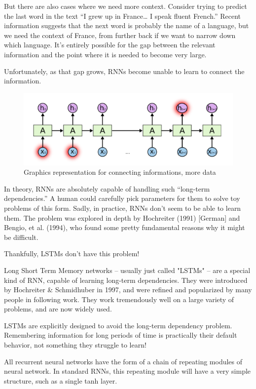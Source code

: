 But there are also cases where we need more context. Consider trying to predict the last word in the text “I grew up in France… I speak fluent French.” Recent information suggests that the next word is probably the name of a language, but we need the context of France, from further back if we want to narrow down which language. It’s entirely possible for the gap between the relevant information and the point where it is needed to become very large.

Unfortunately, as that gap grows, RNNs become unable to learn to connect the information.

\begin{figure}[H]
    \centering
    \includegraphics[width=6.5in]{images/rnnWhatWeNeedButCannot.png}
    \caption{Graphics representation for connecting informations, more data}
\end{figure}

In theory, RNNs are absolutely capable of handling such “long-term dependencies.” A human could carefully pick parameters for them to solve toy problems of this form. Sadly, in practice, RNNs don’t seem to be able to learn them. The problem was explored in depth by Hochreiter (1991) [German] and Bengio, et al. (1994), who found some pretty fundamental reasons why it might be difficult. \cite{lstm}

Thankfully, LSTMs don’t have this problem!

Long Short Term Memory networks – usually just called "LSTMs" – are a special kind of RNN, capable of learning long-term dependencies. They were introduced by Hochreiter \& Schmidhuber in 1997, and were refined and popularized by many people in following work. They work tremendously well on a large variety of problems, and are now widely used.

LSTMs are explicitly designed to avoid the long-term dependency problem. Remembering information for long periods of time is practically their default behavior, not something they struggle to learn!

All recurrent neural networks have the form of a chain of repeating modules of neural network. In standard RNNs, this repeating module will have a very simple structure, such as a single tanh layer.

